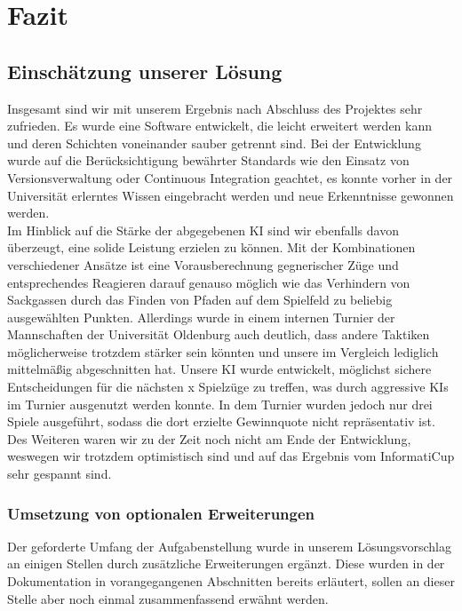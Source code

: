 \chapter{Fazit}
\label{ch:fazit}

\section{Einschätzung unserer Lösung}
\label{sec:einschaetzung}

Insgesamt sind wir mit unserem Ergebnis nach Abschluss des Projektes sehr zufrieden.
Es wurde eine Software entwickelt, die leicht erweitert werden kann und deren Schichten voneinander sauber getrennt
sind.
Bei der Entwicklung wurde auf die Berücksichtigung bewährter Standards wie den Einsatz von Versionsverwaltung oder
Continuous Integration geachtet, es konnte vorher in der Universität erlerntes Wissen eingebracht werden und neue
Erkenntnisse gewonnen werden. \\

Im Hinblick auf die Stärke der abgegebenen \ac{KI} sind wir ebenfalls davon überzeugt, eine solide Leistung erzielen zu
können.
Mit der Kombinationen verschiedener Ansätze ist eine Vorausberechnung gegnerischer Züge und entsprechendes Reagieren
darauf genauso möglich wie das Verhindern von Sackgassen durch das Finden von Pfaden auf dem Spielfeld zu beliebig
ausgewählten Punkten.
Allerdings wurde in einem internen Turnier der Mannschaften der Universität Oldenburg auch deutlich,
dass andere Taktiken möglicherweise trotzdem stärker sein könnten und unsere im Vergleich lediglich mittelmäßig
abgeschnitten hat.
Unsere \ac{KI} wurde entwickelt, möglichst sichere Entscheidungen für die nächsten x Spielzüge zu treffen, was durch aggressive \ac{KI}s im Turnier ausgenutzt werden konnte.
In dem Turnier wurden jedoch nur drei Spiele ausgeführt, sodass die dort erzielte Gewinnquote nicht repräsentativ ist. 
Des Weiteren waren wir zu der Zeit noch
nicht am Ende der Entwicklung, weswegen wir trotzdem optimistisch sind und auf das Ergebnis vom InformatiCup
sehr gespannt sind.

\subsection{Umsetzung von optionalen Erweiterungen}
\label{subsec:optionale-erweiterungen}

Der geforderte Umfang der Aufgabenstellung  wurde in unserem Lösungsvorschlag an einigen
Stellen durch zusätzliche Erweiterungen ergänzt.
Diese wurden in der Dokumentation in vorangegangenen Abschnitten bereits erläutert, sollen an dieser Stelle aber noch
einmal zusammenfassend erwähnt werden. \\

